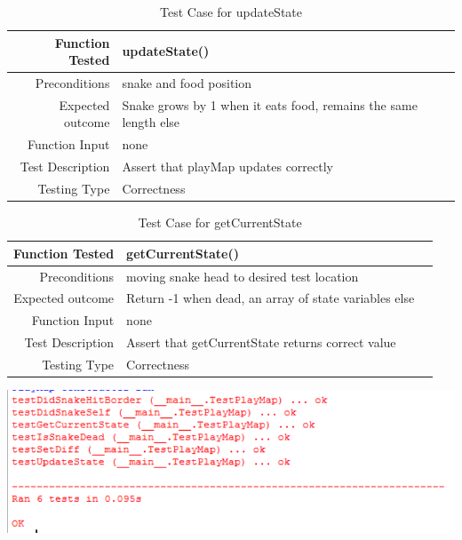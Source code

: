 \documentclass[12pt]{article}
\begin{document}
\begin{center}
	\begin{longtable}{ | r | p{4cm} | p{4cm} }
	\caption{Test Case for updateState} \\ \hline \label{TblInputVar} 
	Function Tested & updateState()\\ \hline
	Preconditions & snake and food position \\ \hline
	Expected outcome & Snake grows by 1 when it eats food, remains the same length else \\ \hline
	Function Input & none \\ \hline
	Test Description & Assert that playMap updates correctly \\ \hline
	Testing Type & Correctness\\ \hline
	
	\end{longtable}
\end{center}

\begin{center}
	\begin{longtable}{ | r | p{4cm} | p{4cm} }
	\caption{Test Case for getCurrentState} \\ \hline \label{TblInputVar} 
	Function Tested & getCurrentState()\\ \hline
	Preconditions & moving snake head to desired test location \\ \hline
	Expected outcome & Return -1 when dead, an array of state variables else \\ \hline
	Function Input & none \\ \hline
	Test Description & Assert that getCurrentState returns correct value\\ \hline
	Testing Type & Correctness\\ \hline
	
	\end{longtable}
\includegraphics{testPlayMapResults}\newline\newline
\end{center}
\end{document}
